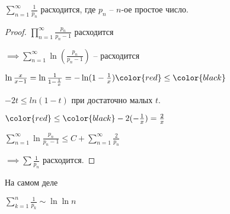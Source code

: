 \begin{theorem}\slashns
	
	
	$\sum\limits_{n=1}^{\infty} \frac1{p_n}$ расходится, где $p_n$ -- $n$-ое простое число.
\end{theorem}

\begin{proof}\slashns
	
	$\prod\limits_{n = 1}^{\infty} \frac{p_n}{p_n-1}$ расходится 
	
	$\implies \sum\limits_{n = 1}^{\infty} \ln (\frac{p_n}{p_n-1})$ -- расходится
	
	$\ln\frac{x}{x-1} = \ln \frac{1}{1 - \frac1x} = -\ln (1-\frac1x) \color{red}\le\color{black}$
	
	$-2t \le ln(1-t)$ при достаточно малых $t$.
	
	$\color{red}\le\color{black} -2(-\frac1x) = \frac2{x}$
	
	$\sum\limits_{n = 1}^{\infty} \ln \frac{p_n}{p_n-1} \le C + \sum\limits_{n=1}^{\infty} \frac2{p_n}$
	
	$\implies \sum \frac1{p_n}$ расходится.
\end{proof}

\begin{remark}\slashns
	
	На самом деле
	
	$\sum\limits_{k = 1}^{n} \frac1{p_k} \sim \ln \ln n$
\end{remark}

